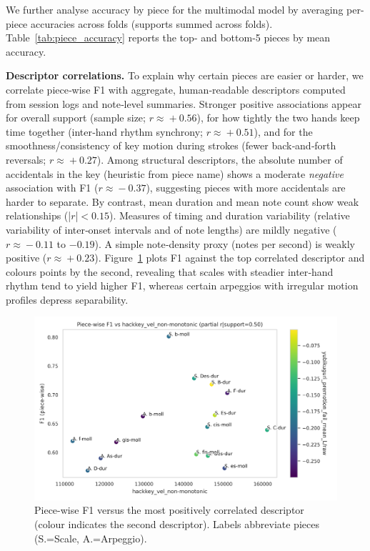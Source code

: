 \documentclass[sigconf,review,anonymous]{acmart}
\begin{document}
We further analyse accuracy by piece for the multimodal model by averaging per-piece accuracies across folds (supports summed across folds). Table~\ref{tab:piece_accuracy} reports the top- and bottom-5 pieces by mean accuracy.

\textbf{Descriptor correlations.}
To explain why certain pieces are easier or harder, we correlate piece‑wise F1 with aggregate, human‑readable descriptors computed from session logs and note‑level summaries. Stronger positive associations appear for overall support (sample size; $r\!\approx\!+0.56$), for how tightly the two hands keep time together (inter‑hand rhythm synchrony; $r\!\approx\!+0.51$), and for the smoothness/consistency of key motion during strokes (fewer back‑and‑forth reversals; $r\!\approx\!+0.27$). Among structural descriptors, the absolute number of accidentals in the key (heuristic from piece name) shows a moderate \emph{negative} association with F1 ($r\!\approx\!-0.37$), suggesting pieces with more accidentals are harder to separate. By contrast, mean duration and mean note count show weak relationships (|$r$|$<\!0.15$). Measures of timing and duration variability (relative variability of inter‑onset intervals and of note lengths) are mildly negative (\mbox{$r\!\approx\!-0.11$} to $-0.19$). A simple note‑density proxy (notes per second) is weakly positive ($r\!\approx\!+0.23$). Figure~\ref{fig:piece_f1_corr} plots F1 against the top correlated descriptor and colours points by the second, revealing that scales with steadier inter‑hand rhythm tend to yield higher F1, whereas certain arpeggios with irregular motion profiles depress separability.

\begin{figure}[t]
  \centering
  \includegraphics[width=0.95\linewidth]{figures/piece_f1_correlation.png}
  \caption{Piece-wise F1 versus the most positively correlated descriptor (colour indicates the second descriptor). Labels abbreviate pieces (S.=Scale, A.=Arpeggio).}
  \label{fig:piece_f1_corr}
\end{figure}
\end{document}
